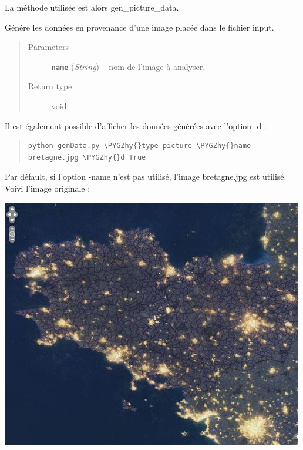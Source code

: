 \documentclass[letterpaper,10pt,english]{sphinxmanual}
\def\PYGZhy{\char`\-}
\begin{document}
La méthode utilisée est alors gen\_picture\_data.

\begin{fulllineitems}
\label{sky:genData.gen_picture_data}
Génére les données en provenance d'une image placée dans le fichier input.
\begin{quote}\begin{description}
\item[{Parameters}] \leavevmode
\textbf{\texttt{name}} (\emph{String}) -- nom de l'image à analyser.

\item[{Return type}] \leavevmode
void

\end{description}\end{quote}

\end{fulllineitems}


Il est également possible d'afficher les données générées avec l'option -d :
\begin{quote}

\begin{Verbatim}[commandchars=\\\{\}]
python genData.py \PYGZhy{}type picture \PYGZhy{}name bretagne.jpg \PYGZhy{}d True
\end{Verbatim}
\end{quote}

Par défault, si l'option -name n'est pas utilisé, l'image bretagne.jpg est utilisé.
Voivi l'image originale :

{\hfill\includegraphics{bretagne.jpg}\hfill}
\end{document}
